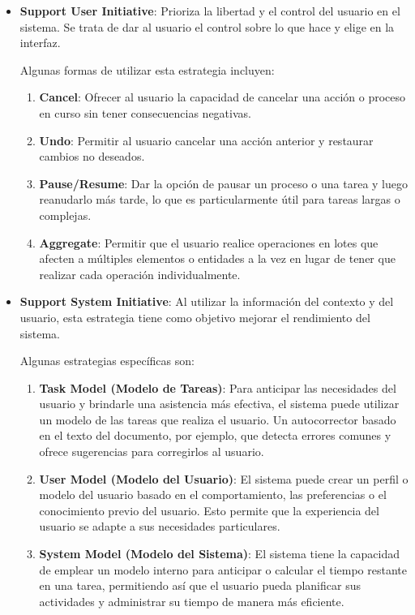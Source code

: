 \documentclass{article}
\begin{document}
		
		\begin{itemize}		
			\item \textbf{Support User Initiative}:
			Prioriza la libertad y el control del usuario en el sistema. Se trata de dar al usuario el control sobre lo que hace y elige en la interfaz. 
			
			Algunas formas de utilizar esta estrategia incluyen:
			\begin{enumerate}
				\item \textbf{Cancel}: Ofrecer al usuario la capacidad de cancelar una acción o proceso en curso sin tener consecuencias negativas.
				
				\item \textbf{Undo}: Permitir al usuario cancelar una acción anterior y restaurar cambios no deseados.
				
				
				\item \textbf{Pause/Resume}: Dar la opción de pausar un proceso o una tarea y luego reanudarlo más tarde, lo que es particularmente útil para tareas largas o complejas.
				
				
				\item \textbf{Aggregate}: Permitir que el usuario realice operaciones en lotes que afecten a múltiples elementos o entidades a la vez en lugar de tener que realizar cada operación individualmente.
				
				
			\end{enumerate}
			
			\item \textbf{Support System Initiative}:
			Al utilizar la información del contexto y del usuario, esta estrategia tiene como objetivo mejorar el rendimiento del sistema. 
			
			Algunas estrategias específicas son:
			\begin{enumerate}
				\item \textbf{Task Model (Modelo de Tareas)}: Para anticipar las necesidades del usuario y brindarle una asistencia más efectiva, el sistema puede utilizar un modelo de las tareas que realiza el usuario. Un autocorrector basado en el texto del documento, por ejemplo, que detecta errores comunes y ofrece sugerencias para corregirlos al usuario.
				
				
				\item \textbf{User Model (Modelo del Usuario)}: El sistema puede crear un perfil o modelo del usuario basado en el comportamiento, las preferencias o el conocimiento previo del usuario. Esto permite que la experiencia del usuario se adapte a sus necesidades particulares.
							
				
				\item \textbf{System Model (Modelo del Sistema)}: El sistema tiene la capacidad de emplear un modelo interno para anticipar o calcular el tiempo restante en una tarea, permitiendo así que el usuario pueda planificar sus actividades y administrar su tiempo de manera más eficiente.
				
				
			\end{enumerate}	
			
		\end{itemize}
	
\end{document}
